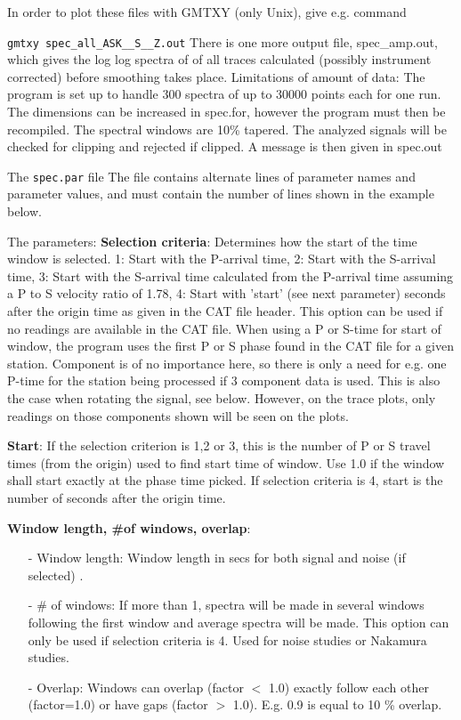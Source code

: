 In order to plot these files with GMTXY (only Unix), give e.g. command

\texttt{gmtxy spec\_all\_ASK\_\_S\_\_Z.out}
\newline
There is one more output file, spec\_amp.out, which gives the log log spectra of  of all traces calculated (possibly instrument corrected) before smoothing takes place.
\newline
Limitations of amount of data: The program is set up to handle 300 spectra of up to 30000 points each for one run. The dimensions can be increased in spec.for, however the program must then be recompiled. The spectral windows are 10\% tapered. The analyzed signals will be checked for clipping and rejected if clipped. A message is then given in spec.out 

The \texttt{spec.par} file The file contains alternate lines of parameter names and parameter values, and must contain the number of lines shown in the example below. 



The parameters: \newline
\textbf{Selection criteria}: Determines how the start of the time window is selected. 1: Start with the P-arrival time, 2: Start with the S-arrival time, 3: Start with the S-arrival time calculated from the P-arrival time assuming a P to S velocity ratio of 1.78, 4: Start with 'start' (see next parameter) seconds after the origin time as given in the CAT file header. This option can be used if no readings are available in the CAT file. When using a P or S-time for start of window, the program uses the first P or S phase found in the CAT file for a given station. Component is of no importance here, so there is only a need for 
e.g. one P-time for the station being processed if 3 component data is used. This is also the case when rotating the signal, see below. However, on the trace plots, only readings on those components shown will be seen on the plots. 

\textbf{Start}: If the selection criterion is 1,2 or 3, this is the number of P or S travel times (from the origin) used to find start time of window. Use 1.0 if the window shall start exactly at the phase time picked. If selection criteria is 4, start is the number of seconds after the origin time. 

\textbf{Window length, \#of windows, overlap}: 

\begin{itemize}
\item[-]
Window length: Window length in secs for both signal and noise (if selected) . 
\item[-]
\# of windows: If more than 1, spectra will be made in several windows following the first window 
and average spectra will be made. This option can only be used if selection criteria is 4. Used for 
noise studies or Nakamura studies. 
\item[-]
Overlap: Windows can overlap (factor $<$ 1.0) exactly follow each other (factor=1.0) or have gaps 
(factor $>$ 1.0). E.g. 0.9 is equal to 10 \% overlap. 
\end{itemize}

